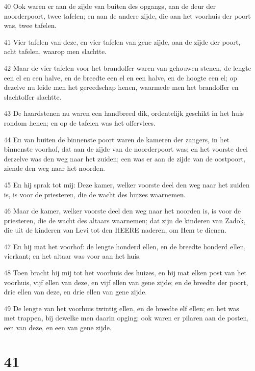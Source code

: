\par 40 Ook waren er aan de zijde van buiten des opgangs, aan de deur der noorderpoort, twee tafelen; en aan de andere zijde, die aan het voorhuis der poort was, twee tafelen.
\par 41 Vier tafelen van deze, en vier tafelen van gene zijde, aan de zijde der poort, acht tafelen, waarop men slachtte.
\par 42 Maar de vier tafelen voor het brandoffer waren van gehouwen stenen, de lengte een el en een halve, en de breedte een el en een halve, en de hoogte een el; op dezelve nu leide men het gereedschap henen, waarmede men het brandoffer en slachtoffer slachtte.
\par 43 De haardstenen nu waren een handbreed dik, ordentelijk geschikt in het huis rondom henen; en op de tafelen was het offervlees.
\par 44 En van buiten de binnenste poort waren de kameren der zangers, in het binnenste voorhof, dat aan de zijde van de noorderpoort was; en het voorste deel derzelve was den weg naar het zuiden; een was er aan de zijde van de oostpoort, ziende den weg naar het noorden.
\par 45 En hij sprak tot mij: Deze kamer, welker voorste deel den weg naar het zuiden is, is voor de priesteren, die de wacht des huizes waarnemen.
\par 46 Maar de kamer, welker voorste deel den weg naar het noorden is, is voor de priesteren, die de wacht des altaars waarnemen; dat zijn de kinderen van Zadok, die uit de kinderen van Levi tot den HEERE naderen, om Hem te dienen.
\par 47 En hij mat het voorhof: de lengte honderd ellen, en de breedte honderd ellen, vierkant; en het altaar was voor aan het huis.
\par 48 Toen bracht hij mij tot het voorhuis des huizes, en hij mat elken post van het voorhuis, vijf ellen van deze, en vijf ellen van gene zijde; en de breedte der poort, drie ellen van deze, en drie ellen van gene zijde.
\par 49 De lengte van het voorhuis twintig ellen, en de breedte elf ellen; en het was met trappen, bij dewelke men daarin opging; ook waren er pilaren aan de posten, een van deze, en een van gene zijde.

\chapter{41}

